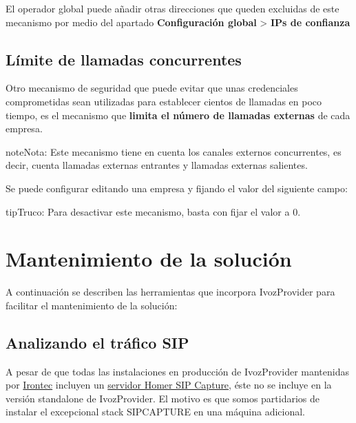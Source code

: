 \documentclass[letterpaper,10pt,spanish]{sphinxmanual}
\begin{document}
El operador global puede añadir otras direcciones que queden excluidas de este mecanismo por medio del apartado \textbf{Configuración global} \textgreater{} \textbf{IPs de confianza}

\noindent{}


\section{Límite de llamadas concurrentes}
\label{security/index:concurrent-call-limit}
Otro mecanismo de seguridad que puede evitar que unas credenciales comprometidas sean utilizadas para establecer cientos de llamadas en poco tiempo, es el mecanismo que \textbf{limita el número de llamadas externas} de cada empresa.

\begin{notice}{note}{Nota:}
Este mecanismo tiene en cuenta los canales externos concurrentes, es decir, cuenta llamadas externas entrantes y llamadas externas salientes.
\end{notice}

Se puede configurar editando una empresa y fijando el valor del siguiente campo:


\begin{notice}{tip}{Truco:}
Para desactivar este mecanismo, basta con fijar el valor a 0.
\end{notice}


\chapter{Mantenimiento de la solución}
\label{maintenance/index::doc}\label{maintenance/index:maintenance-and-troubleshooting}
A continuación se describen las herramientas que incorpora IvozProvider para facilitar el mantenimiento de la solución:


\section{Analizando el tráfico SIP}
\label{maintenance/sip_captures:analyzing-sip-traffic}\label{maintenance/sip_captures::doc}
A pesar de que todas las instalaciones en producción de IvozProvider mantenidas por \href{https://www.irontec.com}{Irontec} incluyen un \href{https://www.sipcapture.org/}{servidor Homer SIP Capture}, éste no se incluye en la versión standalone de IvozProvider. El motivo es que somos partidarios de instalar el excepcional stack SIPCAPTURE en una máquina adicional.
\end{document}
